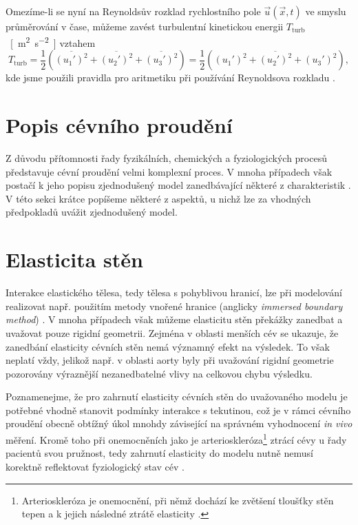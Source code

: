 Omezíme-li se nyní na Reynoldsův rozklad rychlostního pole $ \vec{u} (\vec{x}, t) $ ve smyslu průměrování v čase, můžeme zavést turbulentní kinetickou energii $ T_{\text{turb}} $~\si{[m^{2}.s^{-2}]} vztahem
\begin{equation}\label{eq:turb kin energy}
	T_{\text{turb}} = \dfrac{1}{2} \left( \overline{(u_1 ')^2} + \overline{(u_2 ')^2} + \overline{(u_3 ')^2} \right) = \dfrac{1}{2} \left( \overline{(u_1 ')^2 + (u_2 ')^2 + (u_3 ')^2} \right),
\end{equation}
kde jsme použili pravidla pro aritmetiku při používání Reynoldsova rozkladu \cite{Sodja2007}.

\section{Popis cévního proudění}\label{cevni proudeni}
Z důvodu přítomnosti řady fyzikálních, chemických a fyziologických procesů představuje cévní proudění velmi komplexní proces. V mnoha případech však postačí k jeho popisu zjednodušený model zanedbávající některé z charakteristik \cite{Saloner2019}. V této sekci krátce popíšeme některé z aspektů, u nichž lze za vhodných předpokladů uvážit zjednodušený model.

\section*{\fontsize{11}{15}\selectfont Elasticita stěn}
Interakce elastického tělesa, tedy tělesa s pohyblivou hranicí, lze při modelování realizovat např. použitím metody vnořené hranice (anglicky \textit{immersed boundary method}) \cite{Peskin}. V mnoha případech však můžeme elasticitu stěn překážky zanedbat a uvažovat pouze rigidní geometrii. Zejména v oblasti menších cév se ukazuje, že zanedbání elasticity cévních stěn nemá významný efekt na výsledek. \cite{DempereMarco2006} To však neplatí vždy, jelikož např. v oblasti aorty byly při uvažování rigidní geometrie pozorovány výraznější nezanedbatelné vlivy na celkovou chybu výsledku. \cite{LANTZ2011}

Poznamenejme, že pro zahrnutí elasticity cévních stěn do uvažovaného modelu je potřebné vhodně stanovit podmínky interakce s tekutinou, což je v rámci cévního proudění obecně obtížný úkol mnohdy závisející na správném vyhodnocení \textit{in vivo} měření. Kromě toho při onemocněních jako je arterioskleróza\footnote{Arterioskleróza je onemocnění, při němž dochází ke zvětšení tloušťky stěn tepen a k jejich následné ztrátě elasticity \cite{Fishbein2015}.} ztrácí cévy u řady pacientů svou pružnost, tedy zahrnutí elasticity do modelu nutně nemusí korektně reflektovat fyziologický stav cév \cite{Saloner2019}.

